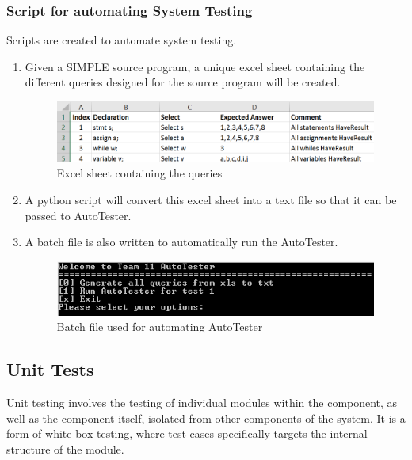 \documentclass[12pt]{article}
\begin{document}
{{{{{{{{{{\subsubsection{Script for automating System Testing}
Scripts are created to automate system testing.
\begin{enumerate}
\item Given a SIMPLE source program, a unique excel sheet containing the different queries designed for the source program will be created. 
\begin{figure}[!htbp]
  \centering 
  \caption{Excel sheet containing the queries}
 \includegraphics[width=1.1\textwidth]{excel.png}
\end{figure}
\item A python script will convert this excel sheet into a text file so that it can be passed to AutoTester. 
\item A batch file is also written to automatically run the AutoTester.
\begin{figure}[!htbp]
  \centering 
  \caption{Batch file used for automating AutoTester}
 \includegraphics[width=1.1\textwidth]{bat.png}
\end{figure}
\end{enumerate}
\subsection{Unit Tests}
Unit testing involves the testing of individual modules within the component, as well as the component itself, isolated from other components of the system. It is a form of white-box testing, where test cases specifically targets the internal structure of the module.
}}}}}}}}}}
\end{document}
